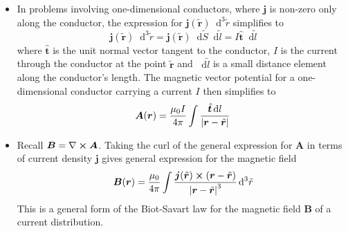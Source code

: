 \documentclass[11pt, a4paper]{article}
\newcommand{\diff}{\mathop{}\!\mathrm{d}} %
\renewcommand{\vec}[1]{\bm{#1}} %
\newcommand{\uvec}[1]{\hat{\vec{#1}}} %
\newcommand{\tvec}[1]{\tilde{\vec{#1}}} %
\renewcommand{\r}{\vec{r}}
\newcommand{\B}{\vec{B}}  %
\newcommand{\A}{\vec{A}}  %
\renewcommand{\curl}{\nabla \cross}
\begin{document}
\begin{itemize}
	\item In problems involving one-dimensional conductors, where $ \vec{j} $ is non-zero only along the conductor, the expression for $ \vec{j}(\tvec{r})\diff^{3}\tilde{r} $ simplifies to
	\begin{equation*}
		\vec{j}(\tvec{r})\diff^{3}\tilde{r} = \vec{j}(\tvec{r}) \diff \tilde{S} \diff \tilde{l} = I \uvec{t} \diff \tilde{l}
	\end{equation*}
	where $ \uvec{t} $ is the unit normal vector tangent to the conductor, $ I $ is the current through the conductor at the point $ \tvec{r} $ and $ \diff \tilde{l} $ is a small distance element along the conductor's length. The magnetic vector potential for a one-dimensional conductor carrying a current $ I $ then simplifies to
	\begin{equation*}
		\A(\r) = \frac{\mu_{0}I}{4\pi} \int \frac{\uvec{t} \diff l}{\abs{\r - \tvec{r}}}
	\end{equation*}
	
	\item Recall $ \B = \curl \A $. Taking the curl of the general expression for $ \A $ in terms of current density $ \vec{j} $ gives general expression for the magnetic field 
	\begin{equation*}
		\B (\r) = \frac{\mu_{0}}{4\pi}\int \frac{\vec{j}(\tvec{r}) \cross (\r - \tvec{r})}{\abs{\r - \tvec{r}}^{3}} \diff^{3}\tilde{r}
	\end{equation*}
	This is a general form of the Biot-Savart law for the magnetic field $ \B $ of a current distribution.
	
\end{itemize}
\end{document}

